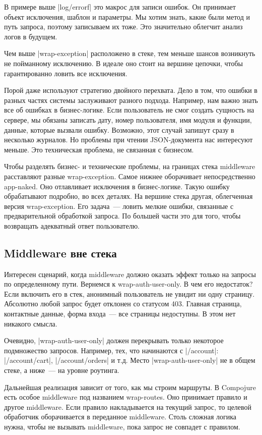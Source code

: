 В примере выше \spverb|log/errorf| это макрос для записи ошибок. Он принимает объект
исключения, шаблон и параметры. Мы хотим знать, какие были метод и путь запроса,
поэтому записываем их тоже. Это значительно облегчит анализ логов в будущем.

Чем выше \spverb|wrap-exception| расположено в стеке, тем меньше шансов возникнуть не
пойманному исключению. В идеале оно стоит на вершине цепочки, чтобы
гарантированно ловить все исключения.

Порой даже используют стратегию двойного перехвата. Дело в том, что ошибки в
разных частях системы заслуживают разного подхода. Например, нам важно знать все
об ошибках в бизнес-логике. Если пользователь не смог создать сущность на
сервере, мы обязаны записать дату, номер пользователя, имя модуля и функции,
данные, которые вызвали ошибку. Возможно, этот случай запишут сразу в несколько
журналов. Но проблемы при чтении JSON-документа нас интересуют меньше. Это
техническая проблема, не связанная с бизнесом.

Чтобы разделять бизнес- и технические проблемы, на границах стека middleware
расставляют разные wrap-exception. Самое нижнее оборачивает непосредственно
app-naked. Оно отлавливает исключения в бизнес-логике. Такую ошибку обрабатывают
подробно, во всех деталях. На вершине стека другая, облегченная версия
wrap-exception. Его задача~--- ловить мелкие ошибки, связанные с предварительной
обработкой запроса. По большей части это для того, чтобы возвращать адекватный
ответ пользователю.

\subsection{Middleware вне стека}

Интересен сценарий, когда middleware должно оказать эффект только на запросы по
определенному пути. Вернемся к wrap-auth-user-only. В чем его недостаток? Если
включить его в стек, анонимный пользователь не увидит ни одну
страницу. Абсолютно любой запрос будет отклонен со статусом 403. Главная
страница, контактные данные, форма входа~--- все страницы недоступны. В этом нет
никакого смысла.

Очевидно, \spverb|wrap-auth-user-only| должен перекрывать только некоторое подмножество
запросов. Например, тех, что начинаются с \spverb|/account|: \spverb|/account/cart|,
\spverb|/account/orders| и т.д. Место \spverb|wrap-auth-user-only| не в общем стеке, а ниже~---
на уровне роутинга.

Дальнейшая реализация зависит от того, как мы строим маршруты. В Compojure есть
особое middleware под названием wrap-routes. Оно принимает правило и другое
middleware. Если правило накладывается на текущий запрос, то целевой обработчик
оборачивается в переданное middleware. Столь сложная логика нужна, чтобы не
вызывать middleware, пока запрос не совпадет с правилом.

